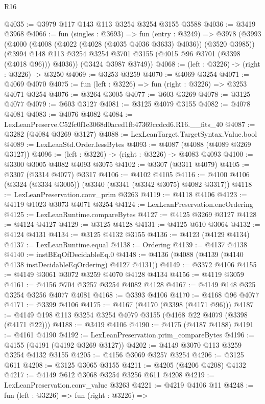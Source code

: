 \begin{lexlean}{R16}
\begin{coremodule}
@4035 := @3979 @117 @143 @113 @3254 @3254 @3155 @3588
@4036 := @3419 @3968
@4066 := fun (singles : @3693) =>
  fun (entry : @3249) =>
  @3978
    (@3993
      (@4000
        (@4008 (@4022 (@4028 (@4035 @4036 @3633) @4036)) (@3520 @3985))
        (@3994 @148 @113 @3254 @3254 @3701 @3155 (@4015 @96 @3701 (@3398 (@4018 @96))) @4036))
      (@3424 @3987 @3749))
@4068 := (left : @3226) -> (right : @3226) -> @3250
@4069 := @3253 @3259
@4070 := @4069 @3254
@4071 := @4069 @4070
@4075 := fun (left : @3226) => fun (right : @3226) => @3253 @4071 @3254
@4076 := @3264 @3005
@4077 := @603 @3269
@4078 := @3125 @4077
@4079 := @603 @3127
@4081 := @3125 @4079 @3155
@4082 := @4078 @4081
@4083 := @4076 @4082
@4084 := LexLeanPreserve.C52fc0f1c3068d0aced1fb47369ccdcd6.R16.__fits_40
@4087 := @3282 (@4084 @3269 @3127)
@4088 := LexLeanTarget.TargetSyntax.Value.bool
@4089 := LexLeanStd.Order.lessBytes
@4093 := @4087 (@4088 (@4089 @3269 @3127))
@4096 := (left : @3226) -> (right : @3226) -> @4083 @4093
@4100 := @3300 @3005 @4082 @4093 @3075
@4102 := @3307 (@3311 @4079)
@4105 := @3307 (@3314 @4077) @3317
@4106 := @4102 @4105
@4116 := @4100 @4106 (@3324 (@3334 @3005)) (@3340 (@3341 (@3342 @3075) @4082 @3317))
@4118 := LexLeanPreservation.conv_prim @3263
@4119 := @4118 @4106
@4123 := @4119 @1023 @3073 @4071 @3254
@4124 := LexLeanPreservation.encOrdering
@4125 := LexLeanRuntime.compareBytes
@4127 := @4125 @3269 @3127
@4128 := @4124 @4127
@4129 := @3125 @4128
@4131 := @4125 @610 @3064
@4132 := @4124 @4131
@4134 := @3125 @4132 @3155
@4136 := @4123 (@4129 @4134)
@4137 := LexLeanRuntime.equal
@4138 := Ordering
@4139 := @4137 @4138
@4140 := instBEqOfDecidableEq.{0}
@4148 := @4136 (@4088 (@4139 (@4140 @4138 instDecidableEqOrdering) @4127 @4131))
@4149 := @3372 @4106
@4155 := @4149 @3061 @3072 @3259 @4070 @4128 @4134
@4156 := @4119 @3059
@4161 := @4156 @704 @3257 @3254 @4082 @4128
@4167 := @4149 @148 @325 @3254 @3256 @4077 @4081
@4168 := @3393 @4106
@4170 := @4168 @96 @4077
@4171 := @3399 @4106
@4175 := @4167 (@4170 (@3398 (@4171 @96)))
@4187 := @4149 @198 @113 @3254 @3254 @4079 @3155 (@4168 @22 @4079 (@3398 (@4171 @22)))
@4188 := @3419 @4106
@4190 := @4175 (@4187 @4188)
@4191 := @4161 @4190
@4192 := LexLeanPreservation.prim_compareBytes
@4196 := @4155 (@4191 (@4192 @3269 @3127))
@4202 := @4149 @3070 @113 @3259 @3254 @4132 @3155
@4205 := @4156 @3069 @3257 @3254
@4206 := @3125 @611
@4208 := @3125 @3065 @3155
@4211 := @4205 (@4206 @4208) @4132
@4217 := @4149 @612 @3068 @3254 @3256 @611 @4208
@4219 := LexLeanPreservation.conv_value @3263
@4221 := @4219 @4106 @11
@4248 := fun (left : @3226) =>
  fun (right : @3226) =>

\end{coremodule}
\end{lexlean}
